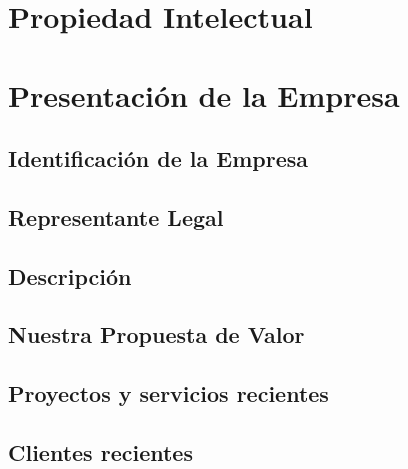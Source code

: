 \documentclass{report}
\begin{document}
	\chapter{Propiedad Intelectual}
	
	\chapter{Presentación de la Empresa}
		\section{Identificación de la Empresa}
		\section{Representante Legal}
		\section{Descripción}
		\section{Nuestra Propuesta de Valor}
		\section{Proyectos y servicios recientes}
		\section{Clientes recientes}
	
\end{document}
